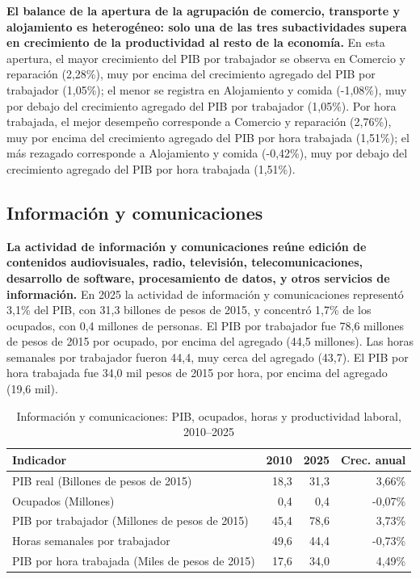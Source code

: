 \textbf{El balance de la apertura de la agrupación de comercio, transporte y alojamiento es heterogéneo: solo una de las tres subactividades supera en crecimiento de la productividad al resto de la economía.} En esta apertura, el mayor crecimiento del PIB por trabajador se observa en Comercio y reparación (2,28\%), muy por encima del crecimiento agregado del PIB por trabajador (1,05\%); el menor se registra en Alojamiento y comida (-1,08\%), muy por debajo del crecimiento agregado del PIB por trabajador (1,05\%). Por hora trabajada, el mejor desempeño corresponde a Comercio y reparación (2,76\%), muy por encima del crecimiento agregado del PIB por hora trabajada (1,51\%); el más rezagado corresponde a Alojamiento y comida (-0,42\%), muy por debajo del crecimiento agregado del PIB por hora trabajada (1,51\%).

\subsection{Información y comunicaciones}

\textbf{La actividad de información y comunicaciones reúne edición de contenidos audiovisuales, radio, televisión, telecomunicaciones, desarrollo de software, procesamiento de datos, y otros servicios de información.} En 2025 la actividad de información y comunicaciones representó 3,1\% del PIB, con 31,3 billones de pesos de 2015, y concentró 1,7\% de los ocupados, con 0,4 millones de personas. El PIB por trabajador fue 78,6 millones de pesos de 2015 por ocupado, por encima del agregado (44,5 millones). Las horas semanales por trabajador fueron 44,4, muy cerca del agregado (43,7). El PIB por hora trabajada fue 34,0 mil pesos de 2015 por hora, por encima del agregado (19,6 mil).

\begin{table}[H]
\centering
\caption{Información y comunicaciones: PIB, ocupados, horas y productividad laboral, 2010--2025}
\label{tab:sector_j_productividad}
\small
\begin{tabular}{lrrr}
\toprule
Indicador & 2010 & 2025 & Crec. anual \\
\midrule
PIB real  (Billones de pesos de 2015) & 18,3 & 31,3 & 3,66\% \\
Ocupados (Millones) & 0,4 & 0,4 & -0,07\% \\
PIB por trabajador (Millones de pesos de 2015) & 45,4 & 78,6 & 3,73\% \\
Horas semanales por trabajador & 49,6 & 44,4 & -0,73\% \\
PIB por hora trabajada (Miles de pesos de 2015) & 17,6 & 34,0 & 4,49\% \\
\bottomrule
\end{tabular}
\end{table}

